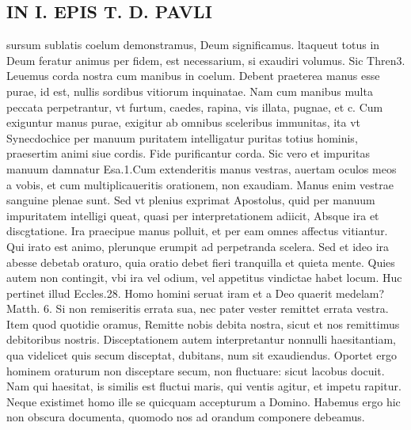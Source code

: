 \documentclass{article}
\begin{document}
\begin{pages}
\section*{IN I. EPIS T. D. PAVLI }
\marginpar{[ p.70 ]}\pstart sursum sublatis coelum demonstramus, Deum significamus. ltaqueut totus in Deum feratur animus per fidem, est necessarium, si exaudiri volumus. Sic Thren3. Leuemus corda nostra cum manibus in coelum. Debent praeterea manus esse purae, id est, nullis sordibus vitiorum inquinatae. Nam cum manibus multa peccata perpetrantur, vt furtum, caedes, rapina, vis illata, pugnae, et c. Cum exiguntur manus purae, exigitur ab omnibus sceleribus immunitas, ita vt Synecdochice per manuum puritatem intelligatur puritas totius hominis, praesertim animi siue cordis. Fide purificantur corda. Sic vero et impuritas manuum damnatur Esa.1.Cum extenderitis manus vestras, auertam oculos meos a vobis, et cum multiplicaueritis orationem, non exaudiam. Manus enim    vestrae sanguine plenae sunt. Sed vt plenius exprimat Apostolus, quid per manuum impuritatem intelligi queat, quasi per interpretationem adiicit, Absque ira et discgtatione. Ira praecipue manus polluit, et per eam omnes affectus vitiantur. Qui irato est animo, plerunque erumpit ad perpetranda scelera. Sed et ideo ira abesse debetab oraturo, quia oratio debet fieri tranquilla et quieta mente. Quies autem non contingit, vbi ira vel odium, vel appetitus vindictae habet locum. Huc pertinet illud Eccles.28. Homo homini seruat iram et a Deo quaerit medelam? Matth. 6. Si non remiseritis errata sua, nec pater vester remittet errata vestra. Item quod quotidie oramus, Remitte nobis debita nostra, sicut et nos remittimus debitoribus nostris. Disceptationem autem interpretantur nonnulli haesitantiam, qua videlicet quis secum disceptat, dubitans, num sit exaudiendus. Oportet ergo hominem oraturum non disceptare secum, non fluctuare: sicut lacobus docuit. Nam qui haesitat, is similis est fluctui maris, qui ventis agitur, et impetu rapitur. Neque existimet homo ille se quicquam accepturum a Domino. Habemus ergo hic non obscura documenta, quomodo nos ad orandum componere debeamus.  \pend
{}
{}

\end{pages}
\end{document}
